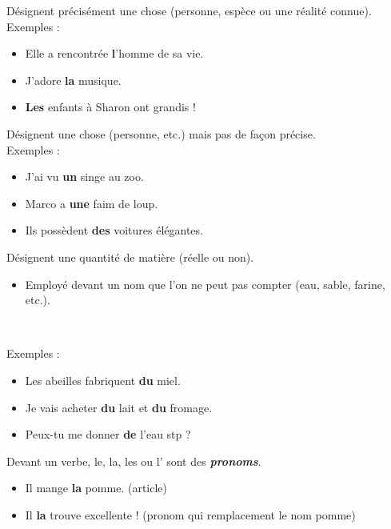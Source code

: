 \documentclass[10pt, french]{article}
\begin{document}
\begin{multicols*}{2}
\begin{definitionNOHFILLsub}
Désignent précisément une chose (personne, espèce ou une réalité connue).		\\

Exemples : 
\begin{itemize}
	\item	Elle a rencontrée \textbf{l}'homme de sa vie.
	\item	J'adore \textbf{la} musique.
	\item	\textbf{Les} enfants à Sharon ont grandis !
\end{itemize}
\end{definitionNOHFILLsub}

\begin{definitionNOHFILLsub}
Désignent une chose (personne, etc.) mais pas de façon précise.	\\

Exemples : 
\begin{itemize}
	\item	J'ai vu \textbf{un} singe au zoo.
	\item	Marco a \textbf{une} faim de loup.
	\item	Ils possèdent \textbf{des} voitures élégantes.
\end{itemize}
\end{definitionNOHFILLsub}

\begin{definitionNOHFILLsub}
Désignent une quantité de matière (réelle ou non).	\\

\begin{itemize}
	\item	Employé devant un nom que l'on ne peut pas compter (eau, sable, farine, etc.).
\end{itemize}

\

Exemples : 
\begin{itemize}
	\item	Les abeilles fabriquent \textbf{du} miel.
	\item	Je vais acheter \textbf{du} lait et \textbf{du} fromage.
	\item	Peux-tu me donner \textbf{de} l'eau stp ?
\end{itemize}
\end{definitionNOHFILLsub}

\begin{astuces}
Devant un verbe, le, la, les ou l' sont des \textbf{\textit{pronoms}}.
\begin{itemize}
	\item	Il mange \textbf{la} pomme. (article)
	\item	Il \textbf{la} trouve excellente ! (pronom qui remplacement le nom pomme)
\end{itemize}
\end{astuces}


\end{multicols*}
\end{document}
